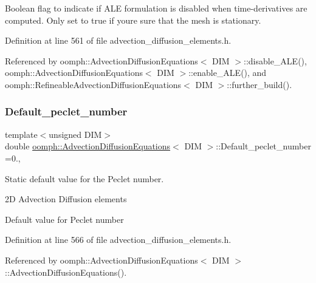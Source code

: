Boolean flag to indicate if A\+LE formulation is disabled when time-\/derivatives are computed. Only set to true if you\textquotesingle{}re sure that the mesh is stationary. 



Definition at line 561 of file advection\+\_\+diffusion\+\_\+elements.\+h.



Referenced by oomph\+::\+Advection\+Diffusion\+Equations$<$ D\+I\+M $>$\+::disable\+\_\+\+A\+L\+E(), oomph\+::\+Advection\+Diffusion\+Equations$<$ D\+I\+M $>$\+::enable\+\_\+\+A\+L\+E(), and oomph\+::\+Refineable\+Advection\+Diffusion\+Equations$<$ D\+I\+M $>$\+::further\+\_\+build().

\mbox{\label{classoomph_1_1AdvectionDiffusionEquations_a7760f126f92f6926928263b9c7831764}} 
\subsubsection{\texorpdfstring{Default\+\_\+peclet\+\_\+number}{Default\_peclet\_number}}
{\footnotesize\ttfamily template$<$unsigned D\+IM$>$ \\
double \hyperlink{classoomph_1_1AdvectionDiffusionEquations}{oomph\+::\+Advection\+Diffusion\+Equations}$<$ D\+IM $>$\+::Default\+\_\+peclet\+\_\+number =0.\hspace{0.3cm}{\ttfamily [static]}, {\ttfamily [private]}}



Static default value for the Peclet number. 

2D Advection Diffusion elements

Default value for Peclet number 

Definition at line 566 of file advection\+\_\+diffusion\+\_\+elements.\+h.



Referenced by oomph\+::\+Advection\+Diffusion\+Equations$<$ D\+I\+M $>$\+::\+Advection\+Diffusion\+Equations().

\mbox{\label{classoomph_1_1AdvectionDiffusionEquations_a3b712468732df04ff28d4efe0bd5cbe5}} 
